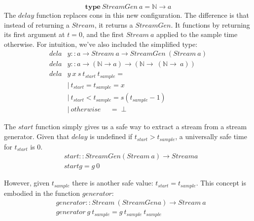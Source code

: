 \documentclass[twocolumn,11pt,english]{article}
\begin{document}
\small
\begin{equation}
  \mathbf{type}~\mathit{StreamGen~a} = \mathbb{N} \rightarrow a
\end{equation}
\normalsize
The $delay$ function replaces cons in this new configuration. The difference is that instead of returning a $Stream$, it returns a $StreamGen$. It functions by returning its first argument at $t = 0$, and the first $Stream~a$ applied to the sample time otherwise. For intuition, we've also included the simplified type:
\small
\begin{align*}
dela&y :: a \rightarrow Stream~a \rightarrow StreamGen~(Stream~a)\\
dela&y :: a \rightarrow (\mathbb{N} \rightarrow a) \rightarrow (\mathbb{N} \rightarrow~(\mathbb{N} \rightarrow~a))\\
dela&y~x~s~t_{start}~t_{sample} =\\
&|~t_{start} = t_{sample} = x\\
&|~t_{start} < t_{sample} = s (t_{sample} - 1)\\
&|~otherwise ~~~~~~=\perp
\end{align*}
\normalsize

The $start$ function simply gives us a safe way to extract a stream from a stream generator. Given that $delay$ is undefined if $t_{start} > t_{sample}$, a universally safe time for $t_{start}$ is 0.
\small
\begin{align*}
&start :: StreamGen (Stream~a) \rightarrow Stream a\\
&start g = g~0
\end{align*}
\normalsize

However, given $t_{sample}$ there is another safe value: $t_{start} = t_{sample}$. This concept is embodied in the function $generator$: 
\small
\begin{align*}
&generator :: Stream~ (StreamGen a) \rightarrow Stream~a\\
&generator~g~t_{sample} = g~t_{sample}~t_{sample}
\end{align*}
\normalsize

\end{document}
